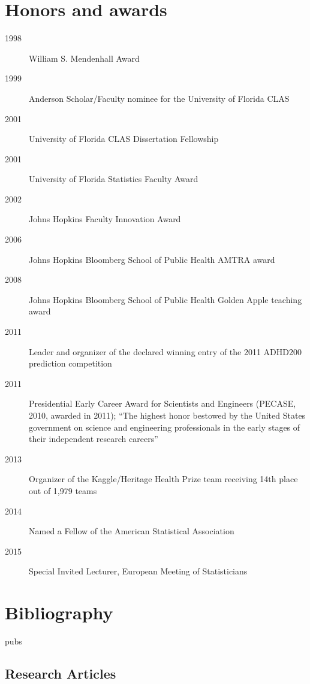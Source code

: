 \documentclass[12pt]{article}
\begin{document}
\section*{Honors and awards}
\begin{description}
\item[\textnormal{1998}] William S. Mendenhall Award
\item[\textnormal{1999}] Anderson Scholar/Faculty nominee for the University of  Florida CLAS
\item[\textnormal{2001}] University of Florida CLAS Dissertation Fellowship
\item[\textnormal{2001}] University of Florida Statistics Faculty Award
\item[\textnormal{2002}] Johns Hopkins Faculty Innovation Award
\item[\textnormal{2006}] Johns Hopkins Bloomberg School of Public Health AMTRA award
\item[\textnormal{2008}] Johns Hopkins Bloomberg School of Public Health Golden Apple teaching award
\item[\textnormal{2011}] Leader and organizer of the declared winning entry of the 2011 ADHD200 prediction competition
\item[\textnormal{2011}] Presidential Early Career Award for
  Scientists and Engineers (PECASE, 2010, awarded in 2011); ``The highest honor bestowed by the
  United States government on science and engineering professionals in
  the early stages of their independent research careers''
\item[\textnormal{2013}] Organizer of the Kaggle/Heritage Health Prize team receiving 14th place out of 1,979 teams
\item[\textnormal{2014}] Named a Fellow of the American Statistical Association
\item[\textnormal{2015}] Special Invited Lecturer, European Meeting of Statisticians
\end{description}

%


\section*{Bibliography}
\begin{btSect}{pubs}
\subsection*{Research Articles}
\btPrintNotCited
\end{btSect}
\end{document}
